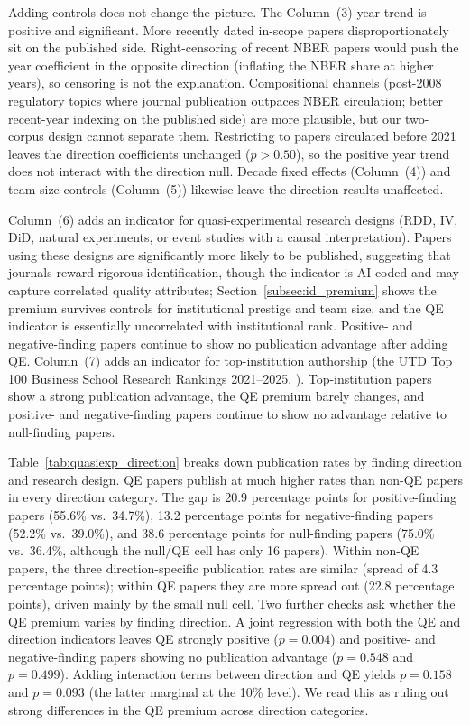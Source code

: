 \documentclass[12pt]{article}
\begin{document}
Adding controls does not change the picture.  The Column~(3) year
trend is positive and significant.  More recently dated in-scope papers
disproportionately sit on the published side.  Right-censoring of
recent NBER papers would push the year coefficient in the
opposite direction (inflating the NBER share at higher
years), so censoring is not the explanation.  Compositional channels
(post-2008 regulatory topics where journal publication outpaces NBER
circulation; better recent-year indexing on the published side) are
more plausible, but our two-corpus design cannot separate them.
Restricting to papers circulated before 2021 leaves the direction
coefficients unchanged ($p > 0.50$), so the positive year trend does
not interact with the direction null.  Decade fixed effects
(Column~(4)) and team size controls (Column~(5)) likewise leave the
direction results unaffected.

Column~(6) adds an indicator for quasi-experimental research designs
(RDD, IV, DiD, natural experiments, or event studies with a causal
interpretation).  Papers using these designs are significantly more
likely to be published, suggesting that journals reward rigorous
identification, though the indicator is AI-coded and may capture
correlated quality attributes; Section~\ref{subsec:id_premium}
shows the premium survives controls for institutional prestige and
team size, and the QE indicator is essentially uncorrelated with
institutional rank.  Positive- and negative-finding papers continue
to show no publication advantage after adding QE.
Column~(7) adds an indicator for top-institution authorship (the UTD
Top 100 Business School Research Rankings 2021--2025,
\citealt*{UTDTop100}).  Top-institution papers show a
strong publication advantage, the QE premium barely changes, and
positive- and negative-finding papers continue to show no advantage
relative to null-finding papers.

Table~\ref{tab:quasiexp_direction} breaks down publication rates by
finding direction and research design.  QE papers publish at much
higher rates than non-QE papers in every direction category.  The gap
is 20.9 percentage points for positive-finding papers (55.6\% vs.\
34.7\%), 13.2 percentage points for negative-finding papers (52.2\%
vs.\ 39.0\%), and 38.6 percentage points for null-finding papers
(75.0\% vs.\ 36.4\%, although the null/QE cell has only 16 papers).
Within non-QE papers, the three direction-specific publication rates
are similar (spread of 4.3 percentage points); within QE papers they
are more spread out (22.8 percentage points), driven mainly by the
small null cell.  Two further checks ask whether the QE premium
varies by finding direction.  A joint regression with both the QE and
direction indicators leaves QE strongly positive ($p = 0.004$) and
positive- and negative-finding papers showing no publication
advantage ($p = 0.548$ and $p = 0.499$).  Adding interaction terms
between direction and QE yields $p = 0.158$ and $p = 0.093$ (the
latter marginal at the 10\% level).  We read this as ruling out
strong differences in the QE premium across direction categories.
\end{document}
